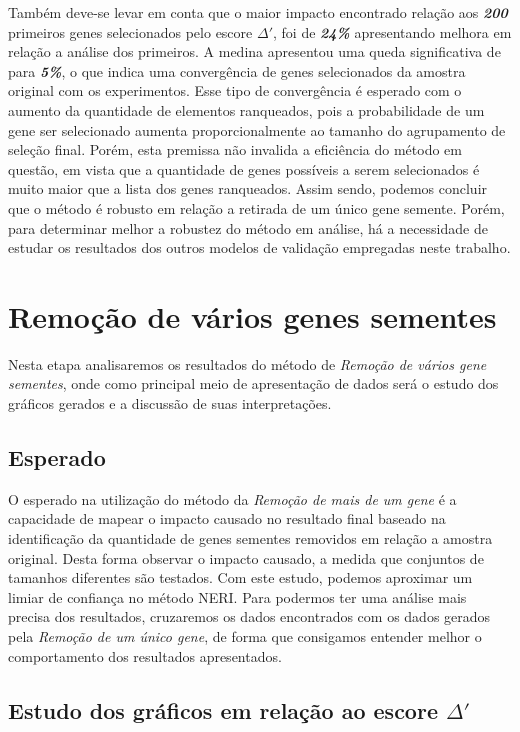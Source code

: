 %
%

Também deve-se levar em conta que o maior impacto encontrado relação aos \textbf{\textit{200}} primeiros genes selecionados pelo escore $\Delta'$, foi de \textbf{\textit{24\%}} apresentando melhora em relação a análise dos \textbf{} primeiros. A medina apresentou uma queda significativa de \textbf{} para \textbf{\textit{5\%}}, o que indica uma convergência de genes selecionados da amostra original com os experimentos. Esse tipo de convergência é esperado com o aumento da quantidade de elementos ranqueados, pois a probabilidade de um gene ser selecionado aumenta proporcionalmente ao tamanho do agrupamento de seleção final. Porém, esta premissa não invalida a eficiência do método em questão, em vista que a quantidade de genes possíveis a serem selecionados é muito maior que a lista dos genes ranqueados.
%
Assim sendo, podemos concluir que o método é robusto em relação a retirada de um único gene semente. Porém, para determinar melhor a robustez do método em análise, há a necessidade de estudar os resultados dos outros modelos de validação empregadas neste trabalho.
%
%
%
%
\section{Remoção de vários genes sementes}
%
Nesta etapa analisaremos os resultados do método de \textit{Remoção de vários gene sementes}, onde como principal meio de apresentação de dados será o estudo dos gráficos gerados e a discussão de suas interpretações.

\subsection{Esperado}
%
O esperado na utilização do método da \textit{Remoção de mais de um gene} é a capacidade de mapear o impacto causado no resultado final baseado na identificação da quantidade de genes sementes removidos em relação a amostra original. Desta forma observar o impacto causado, a medida que conjuntos de tamanhos diferentes são testados. Com este estudo, podemos aproximar um limiar de confiança no método NERI. Para podermos ter uma análise mais precisa dos resultados, cruzaremos os dados encontrados com os dados gerados pela \textit{Remoção de um único gene}, de forma que consigamos entender melhor o comportamento dos resultados apresentados.
%
%
%
%
\subsection{Estudo dos gráficos em relação ao escore $\Delta'$}
%
